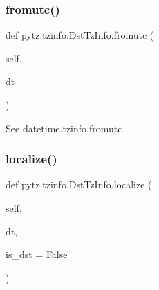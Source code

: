 \subsubsection{\texorpdfstring{fromutc()}{fromutc()}}
{\footnotesize\ttfamily def pytz.\+tzinfo.\+Dst\+Tz\+Info.\+fromutc (\begin{DoxyParamCaption}\item[{}]{self,  }\item[{}]{dt }\end{DoxyParamCaption})}

\begin{DoxyVerb}See datetime.tzinfo.fromutc\end{DoxyVerb}
 \mbox{\label{classpytz_1_1tzinfo_1_1DstTzInfo_af64331f2a0016d6ca9a4cfcc4d86ad89}} 
\subsubsection{\texorpdfstring{localize()}{localize()}}
{\footnotesize\ttfamily def pytz.\+tzinfo.\+Dst\+Tz\+Info.\+localize (\begin{DoxyParamCaption}\item[{}]{self,  }\item[{}]{dt,  }\item[{}]{is\+\_\+dst = {\ttfamily False} }\end{DoxyParamCaption})}

